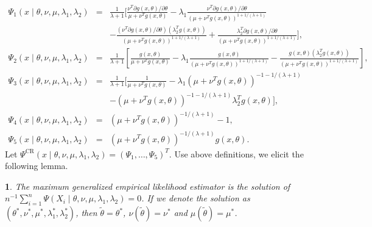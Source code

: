 \documentclass[oneside,english]{amsbook}
\numberwithin{section}{chapter}
\numberwithin{equation}{section}
\numberwithin{figure}{section}
\theoremstyle{plain}
\newtheorem{lem}{\protect\lemmaname}
\theoremstyle{plain}
\theoremstyle{definition}
\theoremstyle{plain}
\theoremstyle{plain}
\theoremstyle{remark}
\theoremstyle{definition}
\theoremstyle{definition}
\providecommand{\lemmaname}{Lemma}
\begin{document}
\begin{eqnarray*}
\Psi_{1}\left(x\mid\theta,\nu,\mu,\lambda_{1},\lambda_{2}\right) & = & \frac{1}{\lambda+1}\Bigg[\frac{\nu^{T}\partial g\left(x,\theta\right)/\partial\theta}{\mu+\nu^{T}g\left(x,\theta\right)}-\lambda_{1}\frac{\nu^{T}\partial g\left(x,\theta\right)/\partial\theta}{\left(\mu+\nu^{T}g\left(x,\theta\right)\right)^{1+1/\left(\lambda+1\right)}}\\
 &  & -\frac{\left(\nu^{T}\partial g\left(x,\theta\right)/\partial\theta\right)\left(\lambda_{2}^{T}g\left(x,\theta\right)\right)}{\left(\mu+\nu^{T}g\left(x,\theta\right)\right)^{1+1/\left(\lambda+1\right)}}+\frac{\lambda_{2}^{T}\partial g\left(x,\theta\right)/\partial\theta}{\left(\mu+\nu^{T}g\left(x,\theta\right)\right)^{1+1/\left(\lambda+1\right)}}\Bigg],\\
\Psi_{2}\left(x\mid\theta,\nu,\mu,\lambda_{1},\lambda_{2}\right) & = & \frac{1}{\lambda+1}\left[\frac{g\left(x,\theta\right)}{\mu+\nu^{T}g\left(x,\theta\right)}-\lambda_{1}\frac{g\left(x,\theta\right)}{\left(\mu+\nu^{T}g\left(x,\theta\right)\right)^{1+1/\left(\lambda+1\right)}}-\frac{g\left(x,\theta\right)\left(\lambda_{2}^{T}g\left(x,\theta\right)\right)}{\left(\mu+\nu^{T}g\left(x,\theta\right)\right)^{1+1/\left(\lambda+1\right)}}\right],\\
\Psi_{3}\left(x\mid\theta,\nu,\mu,\lambda_{1},\lambda_{2}\right) & = & \frac{1}{\lambda+1}\Bigg[\frac{1}{\mu+\nu^{T}g\left(x,\theta\right)}-\lambda_{1}\left(\mu+\nu^{T}g\left(x,\theta\right)\right)^{-1-1/\left(\lambda+1\right)}\\
 &  & -\left(\mu+\nu^{T}g\left(x,\theta\right)\right)^{-1-1/\left(\lambda+1\right)}\lambda_{2}^{T}g\left(x,\theta\right)\Bigg],\\
\Psi_{4}\left(x\mid\theta,\nu,\mu,\lambda_{1},\lambda_{2}\right) & = & \left(\mu+\nu^{T}g\left(x,\theta\right)\right)^{-1/\left(\lambda+1\right)}-1,\\
\Psi_{5}\left(x\mid\theta,\nu,\mu,\lambda_{1},\lambda_{2}\right) & = & \left(\mu+\nu^{T}g\left(x,\theta\right)\right)^{-1/\left(\lambda+1\right)}g\left(x,\theta\right).
\end{eqnarray*}
Let $\Psi^{\mathrm{CR}}\left(x\mid\theta,\nu,\mu,\lambda_{1},\lambda_{2}\right)=\left(\Psi_{1},\ldots,\Psi_{5}\right)^{T}$.
Use above definitions, we elicit the following lemma.
\begin{lem}
\label{lem:extend-m-estimator}The  maximum generalized empirical
likelihood estimator is the solution of $n^{-1}\sum_{i=1}^{n}\Psi\left(X_{i}\mid\theta,\nu,\mu,\lambda_{1},\lambda_{2}\right)=0$.
If we denote the solution as $\left(\theta^{*},\nu^{*},\mu^{*},\lambda_{1}^{*},\lambda_{2}^{*}\right)$,
then $\tilde{\theta}=\theta^{*}$, $\nu\left(\tilde{\theta}\right)=\nu^{*}$
and $\mu\left(\tilde{\theta}\right)=\mu^{*}$.\end{lem}
\end{document}
